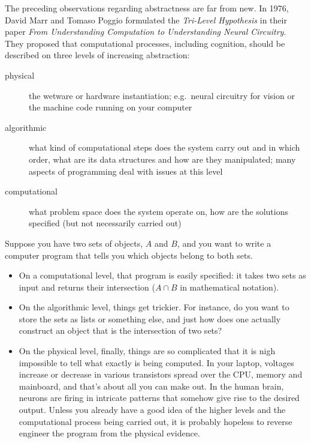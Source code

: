 The preceding observations regarding abstractness are far from new.
In 1976, David Marr and Tomaso Poggio formulated the \emph{Tri-Level Hypothesis} in their paper \emph{From Understanding Computation to Understanding Neural Circuitry}.
They proposed that computational processes, including cognition, should be described on three levels of increasing abstraction:
%
\begin{description}
    \item[physical] the wetware or hardware instantiation; e.g.\ neural circuitry for vision or the machine code running on your computer
    \item[algorithmic] what kind of computational steps does the system carry out and in which order, what are its data structures and how are they manipulated; many aspects of programming deal with issues at this level
    \item[computational] what problem space does the system operate on, how are the solutions specified (but not necessarily carried out)
\end{description}
%
\begin{examplebox}
    Suppose you have two sets of objects, $A$ and $B$, and you want to write a computer program that tells you which objects belong to both sets.
    \begin{itemize}
        \item On a computational level, that program is easily specified: it takes two sets as input and returns their intersection ($A \cap B$ in mathematical notation).
        \item On the algorithmic level, things get trickier.
        For instance, do you want to store the sets as lists or something else, and just how does one actually construct an object that is the intersection of two sets?
    \item On the physical level, finally, things are so complicated that it is nigh impossible to tell what exactly is being computed.
        In your laptop, voltages increase or decrease in various transistors spread over the CPU, memory and mainboard, and that's about all you can make out.
        In the human brain, neurons are firing in intricate patterns that somehow give rise to the desired output.
        Unless you already have a good idea of the higher levels and the computational process being carried out, it is probably hopeless to reverse engineer the program from the physical evidence.
    \end{itemize}\label{ex:formal_intersection}
\end{examplebox}

